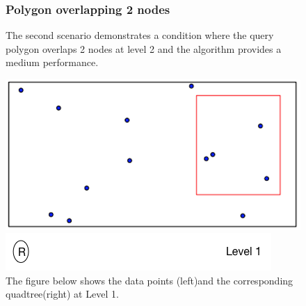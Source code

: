 \documentclass{article}
\begin{document}
\begin{figure}[ht]
\subsubsection{Polygon overlapping 2 nodes}
The second scenario demonstrates a condition where the query polygon overlaps 2 nodes at level 2 and the algorithm provides a medium performance.

\caption{The figure below shows the data points (left)and the corresponding quadtree(right) at Level 1.}
  \centering
  \begin{minipage}[b]{0.35\textwidth}
    \includegraphics[width=\textwidth]{2Quad_1}  
  \end{minipage}
  \hfill
  \begin{minipage}[b]{0.6\textwidth}
    \includegraphics[width=\textwidth]{1_1Quad_1_tree}
  \end{minipage}
\end{figure}
\end{document}
